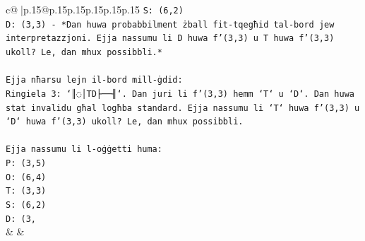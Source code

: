 \documentclass{article}
\begin{document}
{\begin{supertabular}{c@{$\;$}|p{.15\linewidth}@{}p{.15\linewidth}p{.15\linewidth}p{.15\linewidth}p{.15\linewidth}p{.15\linewidth}}
{{{\texttt{S: (6,2)} \\
\texttt{D: (3,3) {-} *Dan huwa probabbilment żball fit{-}tqegħid tal{-}bord jew interpretazzjoni. Ejja nassumu li D huwa f'(3,3) u T huwa f'(3,3) ukoll? Le, dan mhux possibbli.*} \\
\\ 
\texttt{Ejja nħarsu lejn il{-}bord mill{-}ġdid:} \\
\texttt{Ringiela 3: `║◌│TD├──╢`. Dan juri li f'(3,3) hemm `T` u `D`. Dan huwa stat invalidu għal logħba standard. Ejja nassumu li `T` huwa f'(3,3) u `D` huwa f'(3,3) ukoll? Le, dan mhux possibbli.} \\
\\ 
\texttt{Ejja nassumu li l{-}oġġetti huma:} \\
\texttt{P: (3,5)} \\
\texttt{O: (6,4)} \\
\texttt{T: (3,3)} \\
\texttt{S: (6,2)} \\
\texttt{D: (3,} \\
            }
        }
    }
    & & \\ \\


\end{supertabular}}
\end{document}
